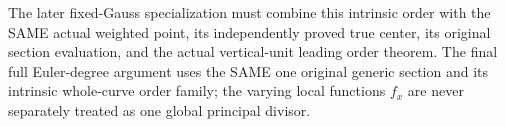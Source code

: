 The later fixed-Gauss specialization must combine this intrinsic order
with the SAME actual weighted point, its independently proved true center,
its original section evaluation, and the actual vertical-unit leading
order theorem. The final full Euler-degree argument uses the SAME one
original generic section and its intrinsic whole-curve order family;
the varying local functions $f_x$ are never separately treated as one
global principal divisor.
